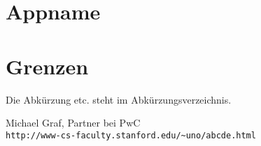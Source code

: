 \documentclass[nomenclature, draft, 150]{HSMW-Thesis}
\begin{document}
\chapter{Appname}


\chapter{Grenzen}
	Die Abkürzung etc. steht im Abkürzungsverzeichnis.

\Anhang


\begin{thebibliography}{99}
		Michael Graf, Partner bei PwC
		\\\texttt{http://www-cs-faculty.stanford.edu/\~{}uno/abcde.html}
		
\end{thebibliography}
\end{document}
